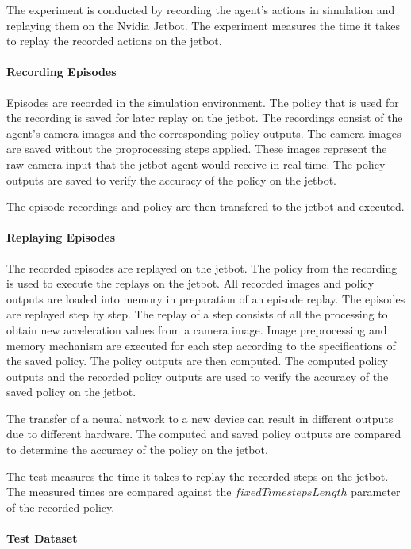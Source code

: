 The experiment is conducted by recording the agent's actions in simulation and replaying them on the Nvidia Jetbot. The experiment measures the time it takes to replay the recorded actions on the jetbot.

\paragraph{Recording Episodes}

Episodes are recorded in the simulation environment. The policy that is used for the recording is saved for later replay on the jetbot.
The recordings consist of the agent's camera images and the corresponding policy outputs. The camera images are saved without the proprocessing steps applied. These images represent the raw camera input that the jetbot agent would receive in real time. The policy outputs are saved to verify the accuracy of the policy on the jetbot.

The episode recordings and policy are then transfered to the jetbot and executed.

\paragraph{Replaying Episodes}

The recorded episodes are replayed on the jetbot. The policy from the recording is used to execute the replays on the jetbot. All recorded images and policy outputs are loaded into memory in preparation of an episode replay.
The episodes are replayed step by step. The replay of a step consists of all the processing to obtain new acceleration values from a camera image. Image preprocessing and memory mechanism are executed for each step according to the specifications of the saved policy. The policy outputs are then computed. The computed policy outputs and the recorded policy outputs are used to verify the accuracy of the saved policy on the jetbot.

The transfer of a neural network to a new device can result in different outputs due to different hardware. The computed and saved policy outputs are compared to determine the accuracy of the policy on the jetbot.

The test measures the time it takes to replay the recorded steps on the jetbot.
The measured times are compared against the $fixedTimestepsLength$ parameter of the recorded policy.


\paragraph{Test Dataset}


